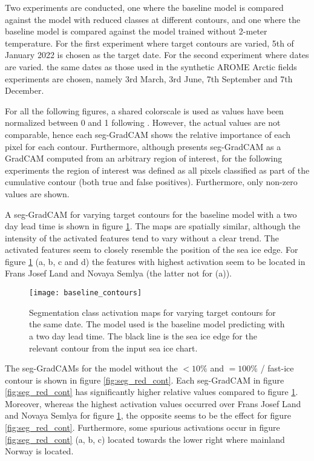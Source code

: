 \documentclass[../main/thesis.tex]{subfiles}
\begin{document}
Two experiments are conducted, one where the baseline model is compared against the model with reduced classes at different contours, and one where the baseline model is compared against the model trained without 2-meter temperature. For the first experiment where target contours are varied, 5th of January 2022 is chosen as the target date. For the second experiment where dates are varied. the same dates as those used in the synthetic AROME Arctic fields experiments are chosen, namely 3rd March, 3rd June, 7th September and 7th December. 

For all the following figures, a shared colorscale is used as values have been normalized between 0 and 1 following \citet{Vinogradova2020}. However, the actual values are not comparable, hence each seg-GradCAM shows the relative importance of each pixel for each contour. Furthermore, although \citet{Vinogradova2020} presents seg-GradCAM as a GradCAM computed from an arbitrary region of interest, for the following experiments the region of interest was defined as all pixels classified as part of the cumulative contour (both true and false positives). Furthermore, only non-zero values are shown.

A seg-GradCAM for varying target contours for the baseline model with a two day lead time is shown in figure \ref{fig:seg_base_cont}. The maps are spatially similar, although the intensity of the activated features tend to vary without a clear trend. The activated features seem to closely resemble the position of the sea ice edge. For figure \ref{fig:seg_base_cont} (a, b, c and d) the features with highest activation seem to be located in Frans Josef Land and Novaya Semlya (the latter not for (a)). 

\begin{figure}
    \centering
    \texttt{[image: baseline\_contours]}
    \caption{\label{fig:seg_base_cont}Segmentation class activation maps for varying target contours for the same date. The model used is the baseline model predicting with a two day lead time. The black line is the sea ice edge for the relevant contour from the input sea ice chart.}
\end{figure}

The seg-GradCAMs for the model without the $<10\%$ and $=100\%$ / fast-ice contour is shown in figure \ref{fig:seg_red_cont}. Each seg-GradCAM in figure \ref{fig:seg_red_cont} has significantly higher relative values compared to figure \ref{fig:seg_base_cont}. Moreover, whereas the highest activation values occurred over Frans Josef Land and Novaya Semlya for figure \ref{fig:seg_base_cont}, the opposite seems to be the effect for figure \ref{fig:seg_red_cont}. Furthermore, some spurious activations occur in figure \ref{fig:seg_red_cont} (a, b, c) located towards the lower right where mainland Norway is located.
\end{document}
